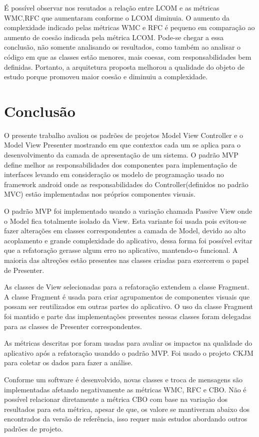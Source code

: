\documentclass[conference]{IEEEtran}
\begin{document}
É possível observar nos resutados a relação entre LCOM e as métricas 
WMC,RFC que aumentaram conforme o LCOM diminuia. O aumento da complexidade
indicado pelas métricas WMC e RFC é pequeno em comparação ao aumento de
coesão indicada pela métrica LCOM. Pode-se chegar a essa conclusão, não somente
analisando os resultados, como também ao analisar o código em que as classes
estão menores, mais coesas, com responsabilidades bem definidas. Portanto, a
arquitetura proposta melhorou a qualidade do objeto de estudo porque promoveu
maior coesão e diminuiu a complexidade.

\section{Conclusão} 

O presente trabalho avaliou os padrões de projetos Model View Controller e o
Model View Presenter mostrando em que contextos cada um se aplica para o
desenvolvimento da camada de apresentação de um sistema.
O padrão MVP define melhor as responsabilidades dos componentes para
implementação de interfaces levando em consideração os modelo de programação
usado no framework android onde as responsabilidades do Controller(definidos no
padrão MVC) estão implementadas nos próprios componentes visuais.

O padrão MVP foi implementado usando a variação chamada Passive View onde o
Model fica totalmente isolado da View. Esta variante foi usada pois evitou-se
fazer alterações em classes correspondentes a camada de Model, devido ao alto
acoplamento e grande complexidade do aplicativo, dessa forma foi possível evitar
que a refatoração gerasse algum erro no aplicativo, mantendo-o funcional. A
maioria das altreções estão presentes nas classes criadas para exercerem o papel
de Presenter.

As classes de View selecionadas para a refatoração extendem a classe Fragment.
A classe Fragment é usada para criar agrupamentos de componentes visuais que
possam ser reutilizados em outras partes do aplicativo. O uso da classe
Fragment foi mantido e parte das implementações presentes nessas classes foram
delegadas para as classes de Presenter correspondentes.

As métricas descritas por  foram usadas para avaliar os
impactos na qualidade do aplicativo após a refatoração usanddo o padrão MVP. Foi
usado o projeto CKJM para coletar os dados para fazer a análise.

Conforme um software é desenvolvido, novas classes e troca de mensagens são
implementadas afetando negativamente as métricas WMC, RFC e CBO. Não é possível
relacionar diretamente a métrica CBO com base na variação dos resultados para
esta métrica, apesar de que, os valore se mantiveram abaixo dos encontrados da
versão de referência, isso requer mais estudos abordando outros padrões de projeto.
\end{document}
